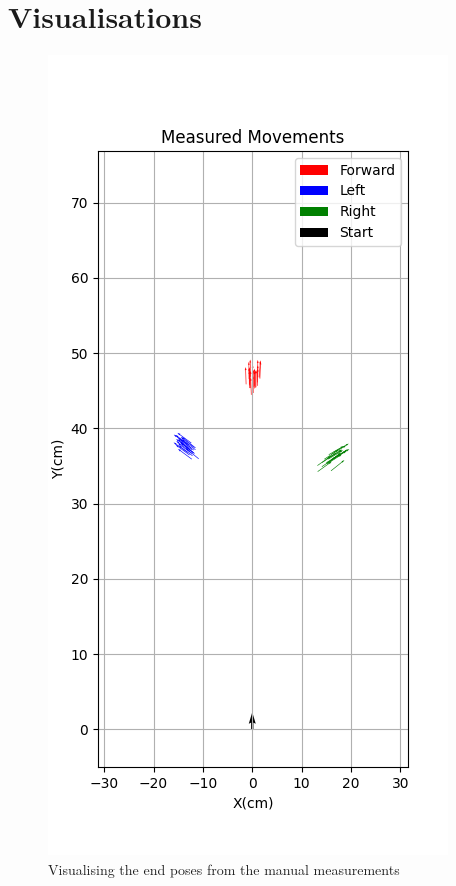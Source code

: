   {
    \section{Visualisations}
    
        \begin{figure}[!ht] 
            \centering \includegraphics[scale=.70]{"images/experiment_2/1.end-poses.png"}
            \caption{Visualising the end poses from the manual measurements}
            \label{fig:end-poses}
        \end{figure}
        
}

